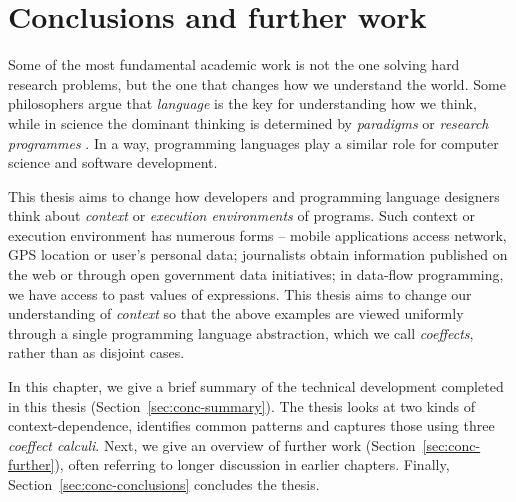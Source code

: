 
\chapter{Conclusions and further work} 
\label{ch:conclusions} 

Some of the most fundamental academic work is not the one solving hard research problems, but the 
one that changes how we understand the world. Some philosophers argue that \emph{language} is the 
key for understanding how we think, while in science the dominant thinking is determined by 
\emph{paradigms} \cite{philosophy-kuhn} or \emph{research programmes} \cite{philosophy-lakatos}.
In a way, programming languages play a similar role for computer science and software development.

This thesis aims to change how developers and programming language designers think about 
\emph{context} or \emph{execution environments} of programs. Such context or execution environment
has numerous forms -- mobile applications access network, GPS location or user's personal data; 
journalists obtain information published on the web or through open government data initiatives;
in data-flow programming, we have access to past values of expressions.
This thesis aims to change our understanding of \emph{context} so that the above examples are 
viewed uniformly through a single programming language abstraction, which we call \emph{coeffects}, 
rather than as disjoint cases.

In this chapter, we give a brief summary of the technical development completed in this thesis
(Section~\ref{sec:conc-summary}). The thesis looks at two kinds of context-dependence, identifies
common patterns and captures those using three \emph{coeffect calculi}. Next, we give an overview
of further work (Section~\ref{sec:conc-further}), often referring to longer discussion in earlier
chapters. Finally, Section~\ref{sec:conc-conclusions} concludes the thesis.


%

